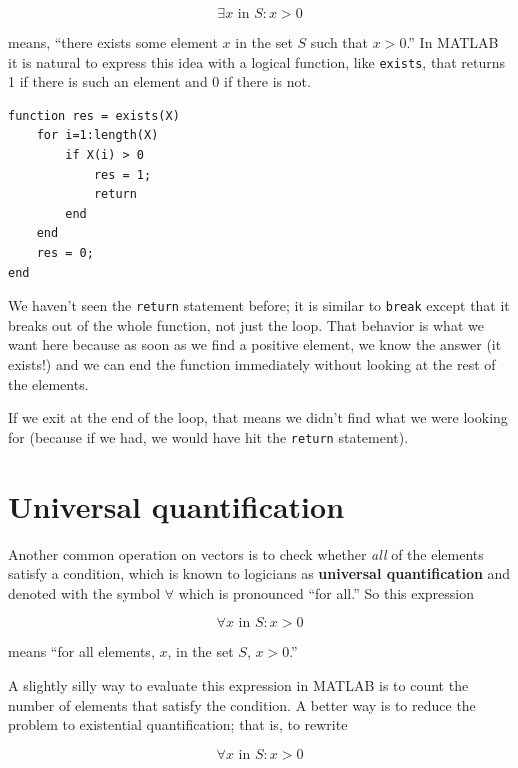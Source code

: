 \documentclass[
]{book}
\begin{document}
\begin{equation}
\exists x \mbox{~in~} S: x>0
\end{equation}

means, ``there exists some element $x$ in the set $S$ such that
$x>0$.''  In MATLAB it is natural to express this idea with a logical
function, like {\tt exists}, that returns 1 if there is such an
element and 0 if there is not.

\begin{verbatim}
function res = exists(X)
    for i=1:length(X)
        if X(i) > 0
            res = 1;
            return
        end
    end
    res = 0;
end
\end{verbatim}

We haven't seen the {\tt return} statement before; it is similar
to {\tt break} except that it breaks out of the whole function, not
just the loop.  That behavior is what we want here because as soon
as we find a positive element, we know the answer (it exists!) and
we can end the function immediately without looking at the rest
of the elements.

If we exit at the end of the loop, that means we didn't find what
we were looking for (because if we had, we would have hit the
{\tt return} statement).



\section{Universal quantification}

Another common operation on vectors is to check whether {\em all}
of the elements satisfy a condition, which is known to
logicians as {\bf universal quantification} and denoted with
the symbol $\forall$ which is pronounced ``for all.''  So this
expression

\begin{equation}
\forall x \mbox{~in~} S: x>0
\end{equation}

means ``for all elements, $x$, in the set $S$, $x>0$.''

A slightly silly way to evaluate this expression in MATLAB is to
count the number of elements that satisfy the condition.
A better way is to reduce the problem to
existential quantification; that is, to rewrite

\begin{equation}
\forall x \mbox{~in~} S: x>0
\end{equation}
\end{document}
